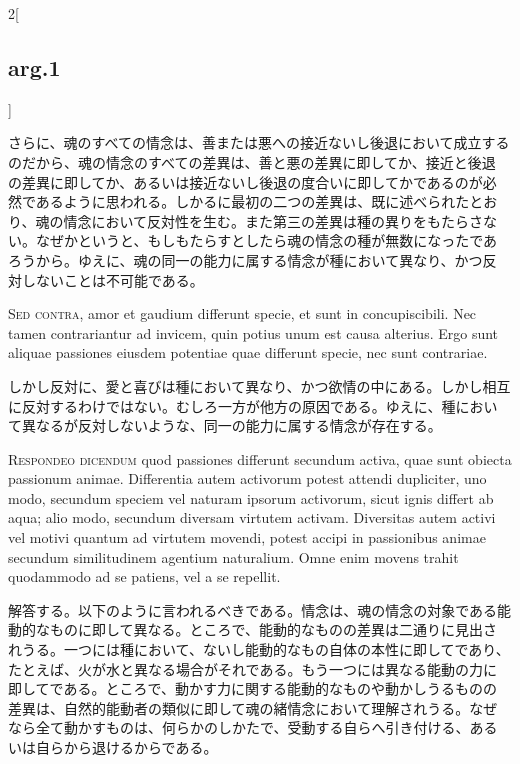 \documentclass[paper=a4paper,fontsize=10pt,jafontsize=9pt,titlepage]{jlreq}
\begin{document}
\begin{paracol}{2}[\subsection{arg.1}]
\switchcolumn

さらに、魂のすべての情念は、善または悪への接近ないし後退において成立する
 のだから、魂の情念のすべての差異は、善と悪の差異に即してか、接近と後退
 の差異に即してか、あるいは接近ないし後退の度合いに即してかであるのが必
 然であるように思われる。しかるに最初の二つの差異は、既に述べられたとお
 り、魂の情念において反対性を生む。また第三の差異は種の異りをもたらさな
 い。なぜかというと、もしもたらすとしたら魂の情念の種が無数になったであ
 ろうから。ゆえに、魂の同一の能力に属する情念が種において異なり、かつ反
 対しないことは不可能である。

\switchcolumn*[\subsection{s.c.}]

{\scshape Sed contra}, amor et gaudium differunt specie, et sunt in
concupiscibili. Nec tamen contrariantur ad invicem, quin potius unum est
causa alterius. Ergo sunt aliquae passiones eiusdem potentiae quae
differunt specie, nec sunt contrariae.

\switchcolumn

しかし反対に、愛と喜びは種において異なり、かつ欲情の中にある。しかし相互
に反対するわけではない。むしろ一方が他方の原因である。ゆえに、種におい
て異なるが反対しないような、同一の能力に属する情念が存在する。


{\scshape Respondeo dicendum} quod passiones differunt secundum activa, quae sunt
obiecta passionum animae. Differentia autem activorum potest attendi
dupliciter, uno modo, secundum speciem vel naturam ipsorum activorum,
sicut ignis differt ab aqua; alio modo, secundum diversam virtutem
activam. Diversitas autem activi vel motivi quantum ad virtutem movendi,
potest accipi in passionibus animae secundum similitudinem agentium
naturalium. Omne enim movens trahit quodammodo ad se patiens, vel a se
repellit.

\switchcolumn

解答する。以下のように言われるべきである。情念は、魂の情念の対象である能
 動的なものに即して異なる。ところで、能動的なものの差異は二通りに見出さ
 れうる。一つには種において、ないし能動的なもの自体の本性に即してであり、
 たとえば、火が水と異なる場合がそれである。もう一つには異なる能動の力に
 即してである。ところで、動かす力に関する能動的なものや動かしうるものの
 差異は、自然的能動者の類似に即して魂の緒情念において理解されうる。なぜ
 なら全て動かすものは、何らかのしかたで、受動する自らへ引き付ける、ある
 いは自らから退けるからである。


\end{paracol}
\end{document}
